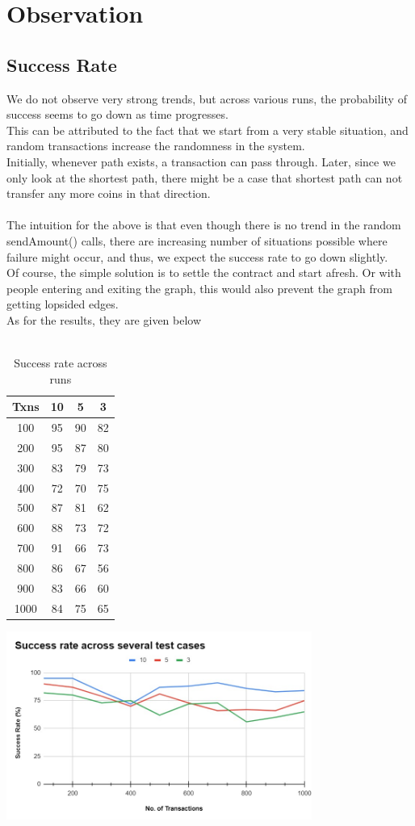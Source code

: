 \documentclass[a4paper,14pt]{article}
\begin{document}
\section{Observation}

\subsection{Success Rate}

We do not observe very strong trends, but across various runs, the probability of success seems to go down as time progresses.\\
This can be attributed to the fact that we start from a very stable situation, and random transactions increase the randomness in the system.\\
Initially, whenever path exists, a transaction can pass through. Later, since we only look at the shortest path, there might be a case that shortest path can not transfer any more coins in that direction.\\\\
The intuition for the above is that even though there is no trend in the random sendAmount() calls, there are increasing number of situations possible where failure might occur, and thus, we expect the success rate to go down slightly.\\
Of course, the simple solution is to settle the contract and start afresh. Or with people entering and exiting the graph, this would also prevent the graph from getting lopsided edges.\\
As for the results, they are given below\\\\
\begin{table}[h!]
    \centering
    \caption{Success rate across runs}
    \label{tab:data}
    \begin{tabular}{|c|c|c|c|}
      \hline
      Txns & 10 & 5 & 3 \\
      \hline
      100 & 95 & 90 & 82 \\
      200 & 95 & 87 & 80 \\
      300 & 83 & 79 & 73 \\
      400 & 72 & 70 & 75 \\
      500 & 87 & 81 & 62 \\
      600 & 88 & 73 & 72 \\
      700 & 91 & 66 & 73 \\
      800 & 86 & 67 & 56 \\
      900 & 83 & 66 & 60 \\
      1000 & 84 & 75 & 65 \\
      \hline
    \end{tabular}
\end{table}
  
\begin{center}
    \includegraphics[width=10cm]{success_rate.jpeg}\\
\end{center}
\end{document}
